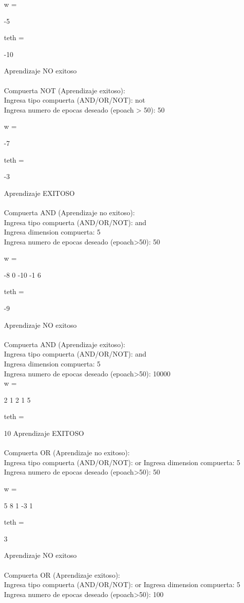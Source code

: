 \documentclass[]{article}
\begin{document}
w =

-5


teth =

-10

Aprendizaje NO exitoso\\\\
Compuerta NOT (Aprendizaje exitoso):\\
Ingresa tipo compuerta (AND/OR/NOT): not\\
Ingresa numero de epocas deseado (epoach > 50): 50

w =

-7


teth =

-3

Aprendizaje EXITOSO\\ \\
Compuerta AND (Aprendizaje no exitoso):\\
Ingresa tipo compuerta (AND/OR/NOT): and\\
Ingresa dimension compuerta: 5\\
Ingresa numero de epocas deseado (epoach>50): 50

w =

-8     0   -10    -1     6


teth =

-9

Aprendizaje NO exitoso\\\\
Compuerta AND (Aprendizaje exitoso):\\
Ingresa tipo compuerta (AND/OR/NOT): and\\
Ingresa dimension compuerta: 5\\
Ingresa numero de epocas deseado (epoach>50): 10000\\

w =

2     1     2     1     5


teth =

10
Aprendizaje EXITOSO\\\\
Compuerta OR (Aprendizaje no exitoso):\\
Ingresa tipo compuerta (AND/OR/NOT): or
Ingresa dimension compuerta: 5
Ingresa numero de epocas deseado (epoach>50): 50

w =

5     8     1    -3     1


teth =

3

Aprendizaje NO exitoso\\\\
Compuerta OR (Aprendizaje exitoso):\\
Ingresa tipo compuerta (AND/OR/NOT): or
Ingresa dimension compuerta: 5
Ingresa numero de epocas deseado (epoach>50): 100
\end{document}
